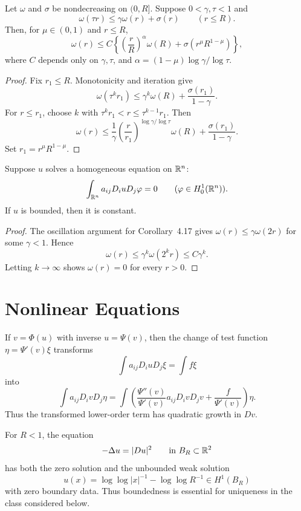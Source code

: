 \begin{lemma}\label{hanlin:weaksol-part2-oscillation-iteration}
Let $\omega$ and $\sigma$ be nondecreasing on $(0,R]$. Suppose
$0<\gamma,\tau<1$ and
\[
\omega(\tau r)\leq\gamma\omega(r)+\sigma(r)
\qquad(r\leq R).
\]
Then, for $\mu\in(0,1)$ and $r\leq R$,
\[
\omega(r)\leq C\left\{
\left(\frac rR\right)^\alpha\omega(R)
+\sigma(r^\mu R^{1-\mu})\right\},
\]
where $C$ depends only on $\gamma,\tau$, and
$\alpha=(1-\mu)\log\gamma/\log\tau$.
\end{lemma}
\begin{proof}
\sketch Fix $r_1\leq R$. Monotonicity and iteration give
\[
\omega(\tau^kr_1)
\leq\gamma^k\omega(R)+\frac{\sigma(r_1)}{1-\gamma}.
\]
For $r\leq r_1$, choose $k$ with
$\tau^kr_1<r\leq\tau^{k-1}r_1$. Then
\[
\omega(r)\leq\frac1\gamma
\left(\frac r{r_1}\right)^{\log\gamma/\log\tau}\omega(R)
+\frac{\sigma(r_1)}{1-\gamma}.
\]
Set $r_1=r^\mu R^{1-\mu}$.
\end{proof}

\begin{corollary}\label{hanlin:weaksol-part2-liouville}
Suppose $u$ solves a homogeneous equation on $\mathbb{R}^n$:
\[
\int_{\mathbb{R}^n}a_{ij}D_i uD_j\varphi=0
\qquad(\varphi\in H^1_0(\mathbb{R}^n)).
\]
If $u$ is bounded, then it is constant.
\end{corollary}
\begin{proof}
\sketch The oscillation argument for Corollary~4.17 gives
$\omega(r)\leq\gamma\omega(2r)$ for some $\gamma<1$. Hence
\[
\omega(r)\leq\gamma^k\omega(2^kr)\leq C\gamma^k.
\]
Letting $k\to\infty$ shows $\omega(r)=0$ for every $r>0$.
\end{proof}

\section{Nonlinear Equations}

If $v=\Phi(u)$ with inverse $u=\Psi(v)$, then the change of test function
$\eta=\Psi'(v)\xi$ transforms
\[
\int a_{ij}D_i uD_j\xi=\int f\xi
\]
into
\[
\int a_{ij}D_i vD_j\eta
=\int\left(
\frac{\Psi''(v)}{\Psi'(v)}a_{ij}D_i vD_j v
+\frac{f}{\Psi'(v)}\right)\eta.
\]
Thus the transformed lower-order term has quadratic growth in $Dv$.

\begin{example}\label{hanlin:weaksol-part2-nonlinear-counterexample}
For $R<1$, the equation
\[
-\Delta u=|Du|^2\qquad\text{in }B_R\subset\mathbb{R}^2
\]
has both the zero solution and the unbounded weak solution
\[
u(x)=\log\log|x|^{-1}-\log\log R^{-1}
\in H^1(B_R)
\]
with zero boundary data. Thus boundedness is essential for uniqueness in the
class considered below.
\end{example}


